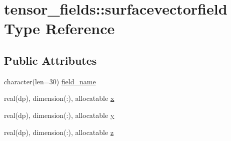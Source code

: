 \hypertarget{structtensor__fields_1_1surfacevectorfield}{\section{tensor\-\_\-fields\-:\-:surfacevectorfield Type Reference}
\label{structtensor__fields_1_1surfacevectorfield}
}
\subsection*{Public Attributes}
\begin{DoxyCompactItemize}
\item 
character(len=30) \hyperlink{structtensor__fields_1_1surfacevectorfield_a4531e0a45bcf34e0fd85ece4e9b513f4}{field\-\_\-name}
\item 
real(dp), dimension(\-:), allocatable \hyperlink{structtensor__fields_1_1surfacevectorfield_a67eee9b7c4ee8d65d0aff88ab39a3b97}{x}
\item 
real(dp), dimension(\-:), allocatable \hyperlink{structtensor__fields_1_1surfacevectorfield_a9a11b3cc0f2e359e112fb0d914296460}{y}
\item 
real(dp), dimension(\-:), allocatable \hyperlink{structtensor__fields_1_1surfacevectorfield_a098c4f5d5b58c380841e0c4d0dc243a3}{z}
\end{DoxyCompactItemize}


